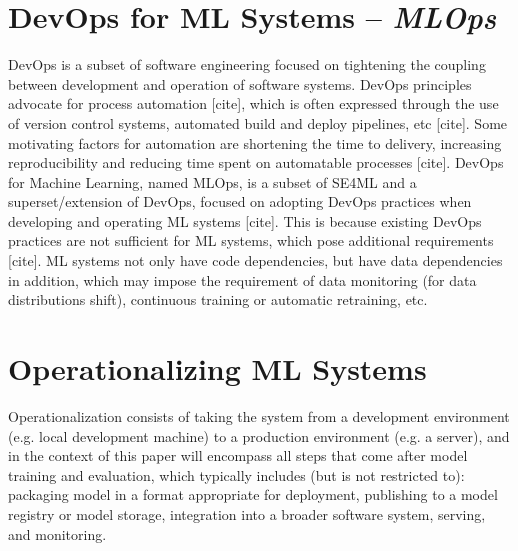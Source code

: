 \section{DevOps for ML Systems -- \emph{MLOps}}
DevOps is a subset of software engineering focused on tightening the coupling between development and operation of software systems.
DevOps principles advocate for process automation [cite], which is often expressed through the use of version control systems, automated build and deploy pipelines, etc [cite].
Some motivating factors for automation are shortening the time to delivery, increasing reproducibility and reducing time spent on automatable processes [cite].
DevOps for Machine Learning, named MLOps, is a subset of SE4ML and a superset/extension of DevOps, focused on adopting DevOps practices when developing and operating ML systems [cite].
This is because existing DevOps practices are not sufficient for ML systems, which pose additional requirements [cite].
ML systems not only have code dependencies, but have data dependencies in addition, which may impose the requirement of data monitoring (for data distributions shift), continuous training or automatic retraining, etc.

\section{Operationalizing ML Systems}
\label{sec:deploying_ml_systems}
Operationalization consists of taking the system from a development environment (e.g. local development machine) to a production environment (e.g. a server), and in the context of this paper will encompass all steps that come after model training and evaluation, which typically includes (but is not restricted to): packaging model in a format appropriate for deployment, publishing to a model registry or model storage, integration into a broader software system, serving, and monitoring.
